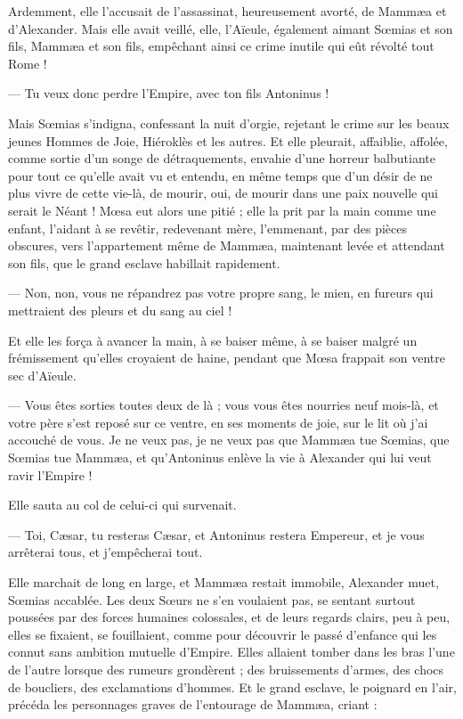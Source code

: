 \documentclass[a4paper, 11pt, oneside, polutonikogreek, french]{article}
\begin{document}
Ardemment, elle l'accusait de l'assassinat, heureusement avorté, de Mammæa et d'Alexander. Mais elle avait veillé, elle, l'Aïeule, également aimant Sœmias et son fils, Mammæa et son fils, empêchant ainsi ce crime inutile qui eût révolté tout Rome !

--- Tu veux donc perdre l'Empire, avec ton fils Antoninus !

Mais Sœmias s'indigna, confessant la nuit d'orgie, rejetant le crime sur les beaux jeunes Hommes de Joie, Hiéroklès et les autres. Et elle pleurait, affaiblie, affolée, comme sortie d'un songe de détraquements, envahie d'une horreur balbutiante pour tout ce qu'elle avait vu et entendu, en même temps que d'un désir de ne plus vivre de cette vie-là, de mourir, oui, de mourir dans une paix nouvelle qui serait le Néant ! Mœsa eut alors une pitié ; elle la prit par la main comme une enfant, l'aidant à se revêtir, redevenant mère, l'emmenant, par des pièces obscures, vers l'appartement même de Mammæa, maintenant levée et attendant son fils, que le grand esclave habillait rapidement.

--- Non, non, vous ne répandrez pas votre propre sang, le mien, en fureurs qui mettraient des pleurs et du sang au ciel !

Et elle les força à avancer la main, à se baiser même, à se baiser malgré un frémissement qu'elles croyaient de haine, pendant que Mœsa frappait son ventre sec d'Aïeule.

--- Vous êtes sorties toutes deux de là ; vous vous êtes nourries neuf mois-là, et votre père s'est reposé sur ce ventre, en ses moments de joie, sur le lit où j'ai accouché de vous. Je ne veux pas, je ne veux pas que Mammæa tue Sœmias, que Sœmias tue Mammæa, et qu'Antoninus enlève la vie à Alexander qui lui veut ravir l'Empire !

Elle sauta au col de celui-ci qui survenait.

--- Toi, Cæsar, tu resteras Cæsar, et Antoninus restera Empereur, et je vous arrêterai tous, et j'empêcherai tout.

Elle marchait de long en large, et Mammæa restait immobile, Alexander muet, Sœmias accablée. Les deux Sœurs ne s'en voulaient pas, se sentant surtout poussées par des forces humaines colossales, et de leurs regards clairs, peu à peu, elles se fixaient, se fouillaient, comme pour découvrir le passé d'enfance qui les connut sans ambition mutuelle d'Empire. Elles allaient tomber dans les bras l'une de l'autre lorsque des rumeurs grondèrent ; des bruissements d'armes, des chocs de boucliers, des exclamations d'hommes. Et le grand esclave, le poignard en l'air, précéda les personnages graves de l'entourage de Mammæa, criant :
\end{document}
